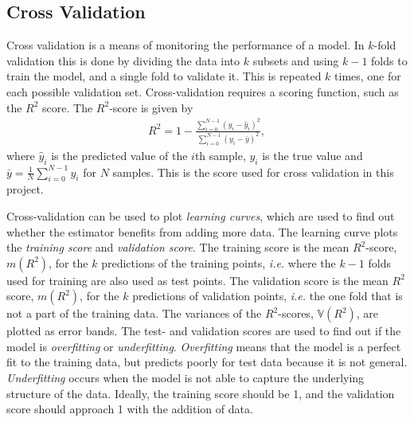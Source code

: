 \documentclass[twoside,english]{uiofysmaster}
\begin{document}
\subsection{Cross Validation}\label{Sec:: gaussian process : Cross Validation}


Cross validation is a means of monitoring the performance of a model. In $k$-fold validation this is done by dividing the data into $k$ subsets and using $k-1$ folds to train the model, and a single fold to validate it. This is repeated $k$ times, one for each possible validation set. Cross-validation requires a scoring function, such as the $R^2$ score. The $R^2$-score is given by 
\begin{align}
R^2 = 1 - \frac{\sum_{i=0}^{N-1} (y_i - \hat{y}_i)^2}{\sum_{i=0}^{N-1} (y_i - \bar{y})^2},
\end{align}
where $\hat{y}_i$ is the predicted value of the $i$th sample, $y_i$ is the true value and $\bar{y} = \frac{1}{N} \sum_{i = 0}^{N-1} y_i$ for $N$ samples. This is the score used for cross validation in this project.

Cross-validation can be used to plot \textit{learning curves}, which are used to find out whether the estimator benefits from adding more data. The learning curve plots the \textit{training score} and \textit{validation score}. The training score is the mean $R^2$-score, $m(R^2)$, for the $k$ predictions of the training points, \textit{i.e.} where the $k-1$ folds used for training are also used as test points. The validation score is the mean $R^2$ score, $m(R^2)$, for the $k$ predictions of validation points, \textit{i.e.} the one fold that is not a part of the training data. The variances of the $R^2$-scores, $\mathbb{V}(R^2)$, are plotted as error bands. The test- and validation scores are used to find out if the model is \textit{overfitting} or \textit{underfitting}. \textit{Overfitting} means that the model is a perfect fit to the training data, but predicts poorly for test data because it is not general. \textit{Underfitting} occurs when the model is not able to capture the underlying structure of the data. Ideally, the training score should be 1, and the validation score should approach 1 with the addition of data.
\end{document}
